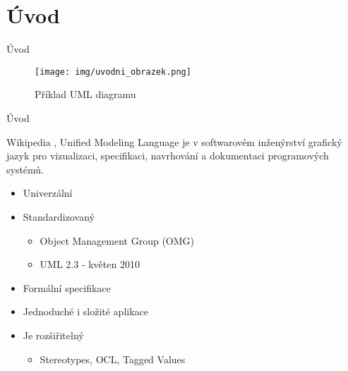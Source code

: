 \section{Úvod}



\begin{frame}{Úvod}

\begin{figure}
	\texttt{[image: img/uvodni\_obrazek.png]}
	\caption{Příklad UML diagramu}
\end{figure}
	
\end{frame}


\begin{frame}{Úvod}

\begin{block}{Wikipedia}
	, Unified Modeling Language je v softwarovém inženýrství 
	grafický jazyk pro vizualizaci, specifikaci, navrhování a 
	dokumentaci programových systémů. 
\end{block}

\pause

\begin{itemize}
	\item<+-> Univerzální
	\item<+-> Standardizovaný
	\onslide<+->
	\begin{itemize}
		\item Object Management Group (OMG)
		\item UML 2.3 - květen 2010
	\end{itemize}
	\item<+-> Formální specifikace
	\item<+-> Jednoduché i složité aplikace
	\item<+-> Je rozšiřitelný
	\onslide<+->
	\begin{itemize}
		\item Stereotypes, OCL, Tagged Values
	\end{itemize}
\end{itemize}
	
\end{frame}


